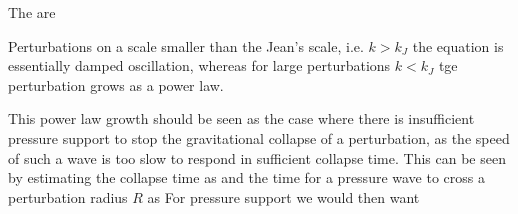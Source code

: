\documentclass{article}
\begin{document}
\begin{definition}
The  are
\end{definition}

Perturbations on a scale smaller than the Jean's scale, i.e. $k>k_J$ the equation is essentially damped oscillation, whereas for large perturbations $k<k_J$ tge perturbation grows as a power law. 

\begin{idea}
This power law growth should be seen as the case where there is insufficient pressure support to stop the gravitational collapse of a perturbation, as the speed of such a wave is too slow to respond in sufficient collapse time. This can be seen by estimating the collapse time as 
and the time for a pressure wave to cross a perturbation radius $R$ as 
For pressure support we would then want 
\end{idea}
\end{document}
